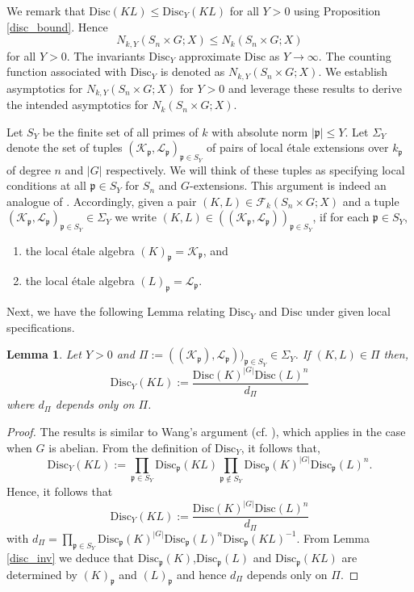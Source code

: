 \documentclass[11pt]{amsart}
\newtheorem{Lemma}[theorem]{Lemma}
\newcommand{\fp}{\mathfrak{p}}
\newcommand{\disc}{\mathrm{Disc}}
\numberwithin{equation}{section}
\begin{document}
We remark that $\disc(KL) \leq \disc_Y(KL)$ for all $Y>0$ using Proposition \ref{disc_bound}. Hence 
\[N_{k, Y}(S_n\times G; X) \leq N_k(S_n\times G; X)\]
for all $Y> 0$. The invariants $\disc_Y$ approximate $\disc$ as $Y \to \infty$. The counting function associated with $\disc_Y$ is denoted as $N_{k, Y}(S_n\times G; X)$. We establish asymptotics for $N_{k, Y}(S_n\times G; X)$ for $Y > 0$ and leverage these results to derive the intended asymptotics for $N_k(S_n\times G; X)$.
 
 \par Let $S_Y$ be the finite set of all primes of $k$ with absolute norm $|\fp|\leq Y$. Let $\Sigma_Y$ denote the set of tuples $(\mathcal{K}_{\fp}, \mathcal{L}_{\fp})_{\fp \in S_Y}$ of pairs of local étale extensions over $k_{\fp}$ of degree $n$ and $|G|$ respectively. We will think of these tuples as specifying local conditions at all $\fp \in S_Y$ for $S_n$ and $G$-extensions. This argument is indeed an analogue of \cite[p.116, l. -12]{Wang2020}. Accordingly, given a pair $(K,L) \in \mathcal{F}_{k}(S_n\times G; X)$ and a tuple $(\mathcal{K}_{\fp}, \mathcal{L}_{\fp})_{\fp \in S_Y} \in \Sigma_Y$ we write $(K,L) \in ((\mathcal{K}_{\fp}, \mathcal{L}_{\fp}))_{\fp \in S_Y}$, if for each $\fp \in S_Y$,
\begin{enumerate}
    \item the local étale algebra $(K)_{\fp} = \mathcal{K}_{\fp}$, and
    \item the local étale algebra $(L)_{\fp} = \mathcal{L}_{\fp}$.
\end{enumerate}
Next, we have the following Lemma relating $\disc_Y$ and $\disc$ under given local specifications.
\begin{Lemma}\label{pi_ind}
    Let $Y > 0$ and $\Pi :=((\mathcal{K}_{\fp}), \mathcal{L}_{\fp}))_{\fp \in S_Y} \in \Sigma_Y$. If $(K,L) \in \Pi$ then,
    \[
    \disc_Y(KL):=\frac{\disc(K)^{|G|}\disc(L)^n}{d_{\Pi}}
    \]
    where $d_{\Pi}$ depends only on $\Pi$.
\end{Lemma}
\begin{proof}
    The results is similar to Wang's argument (cf. \cite[equation (5.5)]{Wang2020}), which applies in the case when $G$ is abelian. From the definition of $\disc_Y$, it follows that,
    \[
    \disc_Y(KL):= \prod_{\fp \in S_Y}\disc_{\fp}(KL)\prod_{\fp \notin S_Y}\disc_{\fp}(K)^{|G|}\disc_{\fp}(L)^n.
    \]
    Hence, it follows that 
    \[
    \disc_Y(KL):=\frac{\disc(K)^{|G|}\disc(L)^n}{d_{\Pi}}
    \]
    with $d_{\Pi} =  \prod_{\fp \in S_Y}\disc_{\fp}(K)^{|G|}\disc_{\fp}(L)^n\disc_{\fp}(KL)^{-1}$. From Lemma \ref{disc_inv} we deduce that $\disc_{\fp}(K)$,$\disc_{\fp}(L)$ and $\disc_{\fp}(KL)$ are determined by $(K)_{\fp}$ and $(L)_{\fp}$ and hence $d_{\Pi}$ depends only on $\Pi$.
\end{proof}
\end{document}
